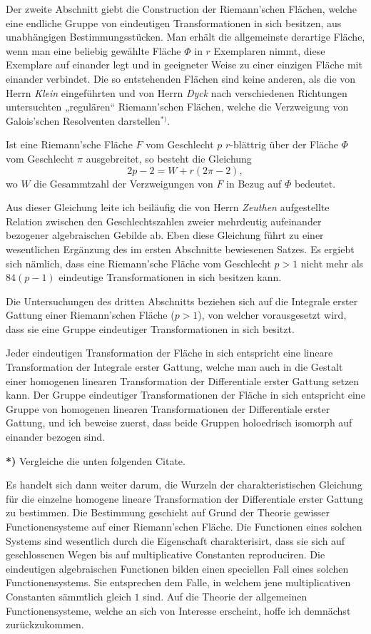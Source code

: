 \documentclass{article}
\begin{document}
Der zweite Abschnitt giebt die Construction der Riemann'schen Flächen, welche eine endliche Gruppe von eindeutigen Transformationen in sich besitzen, aus unabhängigen Bestimmungsstücken. Man erhält die allgemeinste derartige Fläche, wenn man eine beliebig gewählte Fläche $\Phi$ in $r$ Exemplaren nimmt, diese Exemplare auf einander legt und in geeigneter Weise zu einer einzigen Fläche mit einander verbindet. Die so entstehenden Flächen sind keine anderen, als die von Herrn \emph{Klein} eingeführten und von Herrn \emph{Dyck} nach verschiedenen Richtungen untersuchten „regulären“ Riemann'schen Flächen, welche die Verzweigung von Galois'schen Resolventen darstellen${}^{*)}$.

Ist eine Riemann'sche Fläche $F$ vom Geschlecht $p$ $r$-blättrig über der Fläche $\Phi$ vom Geschlecht $\pi$ ausgebreitet, so besteht die Gleichung
\[
2p - 2 = W + r(2\pi - 2),
\]
wo $W$ die Gesammtzahl der Verzweigungen von $F$ in Bezug auf $\Phi$ bedeutet.

Aus dieser Gleichung leite ich beiläufig die von Herrn \emph{Zeuthen} aufgestellte Relation zwischen den Geschlechtszahlen zweier mehrdeutig aufeinander bezogener algebraischen Gebilde ab. Eben diese Gleichung führt zu einer wesentlichen Ergänzung des im ersten Abschnitte bewiesenen Satzes. Es ergiebt sich nämlich, dass eine Riemann'sche Fläche vom Geschlecht $p > 1$ nicht mehr als $84(p-1)$ eindeutige Transformationen in sich besitzen kann.

Die Untersuchungen des dritten Abschnitts beziehen sich auf die Integrale erster Gattung einer Riemann'schen Fläche ($p > 1$), von welcher vorausgesetzt wird, dass sie eine Gruppe eindeutiger Transformationen in sich besitzt.

Jeder eindeutigen Transformation der Fläche in sich entspricht eine lineare Transformation der Integrale erster Gattung, welche man auch in die Gestalt einer homogenen linearen Transformation der Differentiale erster Gattung setzen kann. Der Gruppe eindeutiger Transformationen der Fläche in sich entspricht eine Gruppe von homogenen linearen Transformationen der Differentiale erster Gattung, und ich beweise zuerst, dass beide Gruppen holoedrisch isomorph auf einander bezogen sind.

\textbf{*)} Vergleiche die unten folgenden Citate.

Es handelt sich dann weiter darum, die Wurzeln der charakteristischen Gleichung für die einzelne homogene lineare Transformation der Differentiale erster Gattung zu bestimmen. Die Bestimmung geschieht auf Grund der Theorie gewisser Functionensysteme auf einer Riemann'schen Fläche. Die Functionen eines solchen Systems sind wesentlich durch die Eigenschaft charakterisirt, dass sie sich auf geschlossenen Wegen bis auf multiplicative Constanten reproduciren. Die eindeutigen algebraischen Functionen bilden einen speciellen Fall eines solchen Functionensystems. Sie entsprechen dem Falle, in welchem jene multiplicativen Constanten sämmtlich gleich $1$ sind. Auf die Theorie der allgemeinen Functionensysteme, welche an sich von Interesse erscheint, hoffe ich demnächst zurückzukommen.
\end{document}
